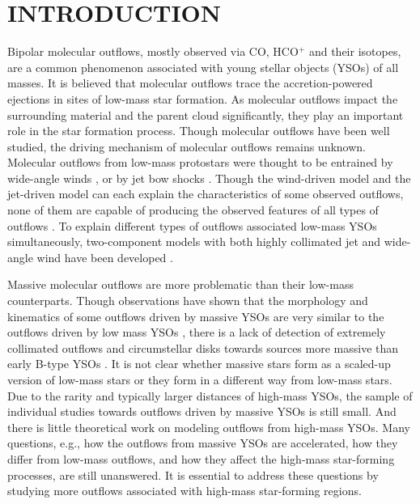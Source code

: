 \section{INTRODUCTION}
Bipolar molecular outflows, mostly observed via CO, HCO$^+$ and their isotopes, are a common phenomenon associated with young stellar objects (YSOs) of all masses\citep{ 1985ARA&A..23..267L,1993prpl.conf..603F, 2001ApJ...552L.167Z,2002A&A...383..892B, 2004A&A...426..503W, 2005AJ....129..330W,  2015MNRAS.453..645M}. It is believed that molecular outflows trace the accretion-powered ejections in sites of low-mass star formation. As molecular outflows impact the surrounding material and the parent cloud significantly, they play an important role in the star formation process. Though molecular outflows have been well studied, the driving mechanism of molecular outflows remains unknown. Molecular outflows from low-mass protostars were thought to be entrained by wide-angle winds \citep{1991ApJ...370L..31S, 2001ApJ...557..429L}, or by jet bow shocks \citep{ 1993A&A...278..267R, 1993ApJ...414..230M, 2001ApJ...557..429L}. Though the wind-driven model and the jet-driven model can each explain the characteristics of some observed outflows, none of them are capable of producing the observed features of all types of outflows \citep{2002ApJ...576..294L}. To explain different types of outflows associated low-mass YSOs simultaneously, two-component models with both highly collimated jet and wide-angle wind have been developed \citep{2000prpl.conf..789S, 2006ApJ...641..949B, 2006MNRAS.365.1131P, 2006ApJ...649..845S, 2007prpl.conf..277P, 2008ApJ...676.1088M}.

Massive molecular outflows are more problematic than their low-mass counterparts. Though observations have shown that the morphology and kinematics of some outflows driven by massive YSOs are very similar to the outflows driven by low mass YSOs \citep[][]{1998ApJ...507..861S, 2002A&A...387..931B, 2009ApJ...696...66Q, 2011MNRAS.415L..49R}, there is a lack of detection of extremely collimated outflows and circumstellar disks towards sources more massive than early B-type YSOs \citep{2007prpl.conf..245A}. It is not clear whether massive stars form as a scaled-up version of low-mass stars or they form in a different way from low-mass stars. Due to the rarity and typically larger distances of high-mass YSOs, the sample of individual studies towards outflows driven by massive YSOs is still small. And there is little theoretical work on modeling outflows from high-mass YSOs. Many questions, e.g., how the outflows from massive YSOs are accelerated, how they differ from low-mass outflows, and how they affect the high-mass star-forming processes, are still unanswered. It is essential to address these questions by studying more outflows associated with high-mass star-forming regions. 

